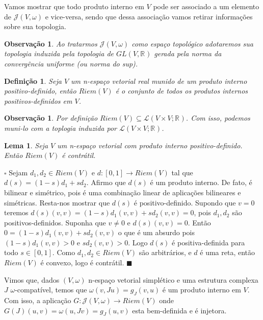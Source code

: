 \documentclass[12pt]{book}
\newtheorem{lema}[teorema]{Lema}
\newtheorem{definicao}[teorema]{Definição}
\newtheorem{observacao}[teorema]{Observação}
\newenvironment{prova}[1]{$\square$ #1}{\hfill$\blacksquare$}
\newcommand{\estruturascomplexaspadrao}{\mathcal{J}(V, \omega)}
\newcommand{\formaSimpletica}[2]{\omega(#1, #2)}
\newcommand{\generalgroup}[2]{GL(#1, #2)}
\newcommand{\generalgroupreal}[1]{\generalgroup{#1}{\real{}}}
\newcommand{\intervalo}{[0,1]}
\newcommand{\produtosinternos}[1]{Riem(#1)}
\newcommand{\real}[1]{\mathbb{R}^{#1}}
\begin{document}
	Vamos mostrar que todo produto interno em $V$ pode ser associado a um elemento de $\estruturascomplexaspadrao$ e vice-versa, sendo que dessa associação vamos retirar informações sobre sua topologia.
	
	\begin{observacao}\label{observacao_conjunto_estrutura_complexa}
		Ao tratarmos $\estruturascomplexaspadrao$ como espaço topológico adotaremos sua topologia induzida pela topologia de $\generalgroupreal{V}$ gerada pela norma da convergência uniforme (ou norma do sup).
	\end{observacao}
	
	\begin{definicao}
		Seja $V$ um n-espaço vetorial real munido de um produto interno positivo-definido, então $\produtosinternos{V}$ é o conjunto de todos os produtos internos positivos-definidos em $V$.
	\end{definicao}
	
	\begin{observacao}
		Por definição $\produtosinternos{V} \subseteq \mathcal{L}(V \times V; \real{})$. Com isso, podemos muni-lo com a toplogia induzida por $\mathcal{L}(V \times V; \real{})$.
	\end{observacao} 
	
	\begin{lema}\label{lema_contratibilidade_produtos_internos}
		Seja $V$ um n-espaço vetorial com produto interno positivo-definido. Então $\produtosinternos{V}$ é contrátil.
	\end{lema}
	\begin{prova}
		Sejam $d_{1},d_{2} \in \produtosinternos{V}$ e $d:\intervalo\to \produtosinternos{V}$ tal que $d(s) = (1-s)d_{1}+ s d_{2}$. Afirmo que $d(s)$ é um produto interno. De fato, é bilinear e simétrico, pois é uma combinação linear de aplicações bilineares e simétricas. Resta-nos mostrar que $d(s)$ é positivo-definido. Supondo que $v =0$ teremos $d(s)(v,v)=(1-s)d_{1}(v,v)+ s d_{2}(v,v)  =0$, pois $d_{1}, d_{2}$ são positivos-definidos. Suponha que $v\neq 0$ e $d(s)(v,v) = 0$. Então $0=(1-s)d_{1}(v,v)+ s d_{2}(v,v)  $ o que é um absurdo pois $(1-s)d_{1}(v,v)>0 $ e $sd_{2}(v,v)> 0$. Logo $d(s)$ é positiva-definida para todo $s \in \intervalo$. Como $d_{1}, d_{2} \in \produtosinternos{V}$ são arbitrários, e $d$ é uma reta, então $\produtosinternos{V}$ é convexo, logo é contrátil.
	\end{prova}
	
	Vimos que, dados $(V, \omega)$ n-espaço vetorial simplético e uma estrutura complexa $J$ $\omega$-compatível, temos que $\formaSimpletica{v}{Ju} = g_{J}(v,u)$ é um produto interno em $V$. Com isso, a aplicação $G:\estruturascomplexaspadrao \to \produtosinternos{V}$ onde $G(J)(u,v) = \omega(u,Jv) = g_{J}(u,v)$ esta bem-definida e é injetora.
	
\end{document}
